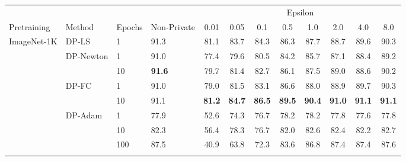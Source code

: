 \documentclass[letterpaper]{article} \usepackage{fullpage}
\begin{document}
\begin{table*}[!h]
	\centering
	\small
	\begin{tabular}{llll|cccccccc}
		\toprule
		\addlinespace[0.1cm]
		& & & & \multicolumn{8}{c}{Epsilon} \\
		\addlinespace[0.1cm]
		\hline
		\addlinespace[0.1cm]
		Pretraining          & Method                      & Epochs & Non-Private & 0.01 & 0.05 & 0.1  & 0.5  & 1.0  & 2.0  & 4.0  & 8.0  \\
		\midrule
		        
		\multirow{8}{*}{ImageNet-1K}   &  \multirow{ 1}{*}{DP-LS}
		                                                   & 1      & 91.3        & 81.1 & 83.7 & 84.3 & 86.3 & 87.7 & 88.7 & 89.6 & 90.3 \\ \addlinespace[0.1cm]
\addlinespace[0.1cm]
		                     & \multirow{ 2}{*}{DP-Newton} & 1      & 91.0        & 77.4 & 79.6 & 80.5 & 84.2 & 85.7 & 87.1 & 88.4 & 89.2 \\
		                     &                             & 10     & \textbf{91.6}        & 79.7 & 81.4 & 82.7 & 86.1 & 87.5 & 89.0 & 88.6 & 90.2 \\
		\addlinespace[0.1cm]
\addlinespace[0.1cm]
		                     & \multirow{ 2}{*}{DP-FC}     & 1      & 91.0        & 79.0 & 81.5 & 83.1 & 86.6 & 88.0 & 88.9 & 89.7 & 90.3 \\
		                     &                             & 10     & 91.1        & \textbf{81.2} & \textbf{84.7} & \textbf{86.5} & \textbf{89.5} & \textbf{90.4} & \textbf{91.0} & \textbf{91.1} & \textbf{91.1} \\
		\addlinespace[0.1cm]
\addlinespace[0.1cm]
		                     & \multirow{ 3}{*}{DP-Adam}   & 1      & 77.9        & 52.6 & 74.3 & 76.7 & 78.2 & 78.2 & 77.8 & 77.6 & 77.8 \\
		                     &                             & 10     & 82.3        & 56.4 & 78.3 & 76.7 & 82.0 & 82.6 & 82.4 & 82.2 & 82.7 \\ &                             & 100    & 87.5        & 40.9 & 63.8 & 72.3 & 83.6 & 86.8 & 87.4 & 87.4 & 87.6 \\ 

		                
		\addlinespace[0.2cm]
		\hline
		\addlinespace[0.2cm]
		        

\end{tabular}
\end{table*}
\end{document}
